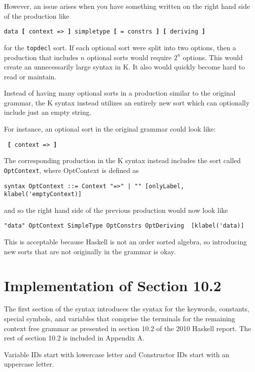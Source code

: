 However, an issue arises when you have something written on the right hand side of the production like

\texttt{data \textbf{[} context => \textbf{]} simpletype \textbf{[} = constrs \textbf{]} \textbf{[} deriving \textbf{]}}

for the \texttt{topdecl} sort. If each optional sort were split into two options, then a production that includes $n$ optional sorts would require $2^n$ options. This would create an unnecessarily large syntax in K. It also would quickly become hard to read or maintain.

Instead of having many optional sorts in a production similar to the original grammar, the K syntax instead utilizes an entirely new sort which can optionally include just an empty string.

For instance, an optional sort in the original grammar could look like:

\texttt{ \textbf{[} context => \textbf{]} }

The corresponding production in the K syntax instead includes the sort called \texttt{OptContext}, where OptContext is defined as

\begin{lstlisting}
syntax OptContext ::= Context "=>" | "" [onlyLabel, klabel('emptyContext)]
\end{lstlisting}

and so the right hand side of the previous production would now look like

\begin{lstlisting}
"data" OptContext SimpleType OptConstrs OptDeriving  [klabel('data)]
\end{lstlisting}

This is acceptable because Haskell is not an order sorted algebra, so introducing new sorts that are not originally in the grammar is okay.

\section{Implementation of Section 10.2}
The first section of the syntax introduces the syntax for the keywords, constants, special symbols, and variables that comprise the terminals for the remaining context free grammar as presented in section 10.2 of the 2010 Haskell report. The rest of section 10.2 is included in Appendix A.

Variable IDs start with lowercase letter and Constructor IDs start with an uppercase letter.

